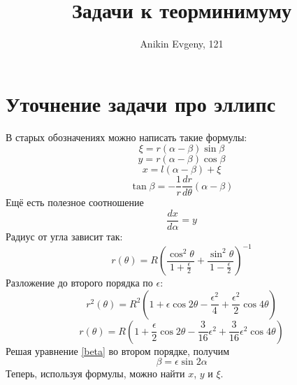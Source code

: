 \documentclass{article}
\title{Задачи к теорминимуму}
\author{Anikin Evgeny, 121}
\begin{document}
\maketitle
\section{Уточнение задачи про эллипс}
В старых обозначениях можно написать такие формулы:
\begin{equation}
	\xi = r(\alpha - \beta) \sin\beta
\end{equation}
\begin{equation}
	y = r(\alpha - \beta) \cos\beta
\end{equation}
\begin{equation}
	x = l(\alpha - \beta) + \xi
\end{equation}
\begin{equation}
	\label{beta}
	\tan \beta = -\frac1r \frac{dr}{d\theta} (\alpha - \beta)
\end{equation}
Ещё есть полезное соотношение
\begin{equation}
	\frac{dx}{d\alpha} = y
\end{equation}
Радиус от угла зависит так:
\begin{equation}
	r(\theta) = R\left( 
		\frac{\cos^{2}{\theta}}{1 + {\displaystyle \frac{\epsilon}{2}}} 
		+ \frac{\sin^{2}{\theta}}{1 - {\displaystyle \frac{\epsilon}{2}}} 
		\right)^{-1}
\end{equation}
Разложение до второго порядка по $\epsilon$:
\begin{equation}
	r^2(\theta) = R^2\left(1 +\epsilon\cos{2\theta} - 
		\frac{\epsilon^2}{4} + \frac{\epsilon^2}{2}\cos{4\theta}\right)
\end{equation}
\begin{equation}
	r(\theta) = R\left ( 1 + \frac{\epsilon}2 \cos{2\theta}
						- \frac{3}{16} \epsilon^2
						+ \frac{3}{16} \epsilon^2 \cos{4\theta} \right )
\end{equation} 
Решая уравнение \ref{beta} во втором порядке, получим
\begin{equation}
	\beta = \epsilon \sin{2\alpha}
\end{equation}
Теперь, используя формулы, можно найти $x$, $y$ и $\xi$.
\begin{equation}
\end{equation}
\begin{equation}
\end{equation}
\begin{equation}
\end{equation}
\end{document}
